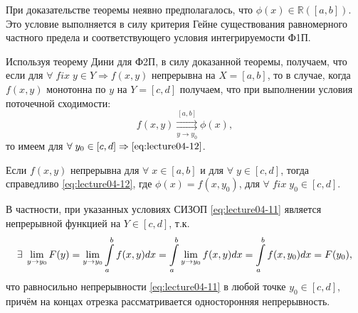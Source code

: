 \begin{notes}
	\item При доказательстве теоремы неявно предполагалось, что $\phi(x) \in \mathbb{R}([a,b])$. Это условие выполняется в силу критерия Гейне существования равномерного частного предела и соответствующего условия интегрируемости Ф1П.
	\item Используя теорему Дини для Ф2П, в силу доказанной теоремы, получаем, что если для $\forall \; fix \; y \in Y \Rightarrow f(x,y)$ непрерывна на $X = [a,b]$, то в случае, когда $f(x,y)$ монотонна по $y$ на $Y = [c,d]$ получаем, что при выполнении условия поточечной сходимости:
	\begin{equation*}
	f(x,y) \underset{y \to y_0}{\overset{[a,b]}{\rightrightarrows}} \phi(x),
	\end{equation*}
	то имеем для $\forall \; y_0 \in [c,d] \Rightarrow \eqref{eq:lecture04-12}$.
	\item Если $f(x,y)$ непрерывна для $\forall \; x \in [a,b]$ и для $\forall \; y \in [c,d]$, тогда справедливо \eqref{eq:lecture04-12}, где $\phi(x) = f(x, y_0)$, для $\forall \; fix \; y_0 \in [c,d]$.
	
	В частности, при указанных условиях СИЗОП \eqref{eq:lecture04-11} является непрерывной функцией на $Y \in [c,d]$, т.к.
	\begin{equation*}
	\exists \; \lim\limits_{y \to y_0} F(y) = \lim\limits_{y \to y_0} \displaystyle\int\limits_a^b f(x,y)dx = \displaystyle\int\limits_a^b \lim\limits_{y \to y_0} f(x,y)dx= \displaystyle\int\limits_a^b f(x,y_0)dx = F(y_0),
	\end{equation*}
	что равносильно непрерывности \eqref{eq:lecture04-11} в любой точке $y_0 \in [c,d]$, причём на концах отрезка рассматривается односторонняя непрерывность.
\end{notes}
